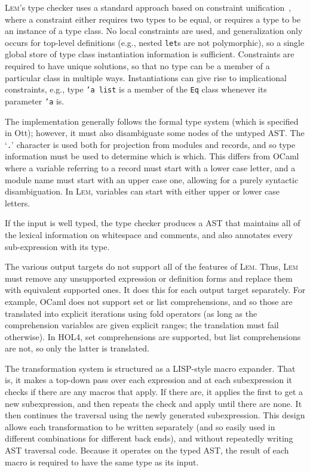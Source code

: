 \documentclass[a4paper]{llncs}
\newcommand{\myparagraph}[1]{\vspace{0.5\baselineskip}\par\noindent{\normalsize\bfseries{#1}}\quad}
\newcommand{\Lem}{\textsc{Lem}}
\begin{document}
\myparagraph{Type checking}
\Lem{}'s type checker uses a standard approach based on constraint
unification~\cite[Section 3]{typeconstraints}, where a constraint either
requires two types to be equal, or requires a type to be an instance of a type
class.  No local constraints are used, and generalization only occurs for
top-level definitions (e.g., nested \texttt{let}s are not polymorphic), so a
single global store of type class instantiation information is sufficient.
Constraints are required to have unique solutions, so that no type can be a
member of a particular class in multiple ways.  Instantiations can give rise to
implicational constraints, e.g., type \texttt{'a list} is a member of the
\texttt{Eq} class whenever its parameter \texttt{'a} is.

The implementation generally follows the formal type system (which is specified
in Ott); however, it must also disambiguate some nodes of the untyped AST.  The
`\texttt{.}' character is used both for projection from modules and records,
and so type information must be used to determine which is which.  This differs
from OCaml where a variable referring to a record must start with a lower case
letter, and a module name must start with an upper case one, allowing for a
purely syntactic disambiguation.  In \Lem{}, variables can start with either
upper or lower case letters.

If the input is well typed, the type checker produces a AST that maintains all
of the lexical information on whitespace and comments, and also annotates every
sub-expression with its type.

\myparagraph{Transformation}
The various output targets do not support all of the features of \Lem{}.
Thus, \Lem{} must remove any unsupported expression or definition forms and
replace them with equivalent supported ones.  It does this for each output
target separately.  For example, OCaml does not support set or list
comprehensions, and so those are translated into explicit iterations using fold
operators (as long as the comprehension variables are given explicit ranges; the
translation must fail otherwise).  In HOL4, set comprehensions are supported,
but list comprehensions are not, so only the latter is translated.

The transformation system is structured as a LISP-style macro expander.  That
is, it makes a top-down pass over each expression and at each subexpression it
checks if there are any macros that apply.  If there are, it applies the first
to get a new subexpression, and then repeats the check and apply until there are
none.  It then continues the traversal using the newly generated subexpression.
This design allows each transformation to be written separately (and so easily
used in different combinations for different back ends), and without repeatedly
writing AST traversal code.  Because it operates on the typed AST, the result of
each macro is required to have the same type as its input.
\end{document}

